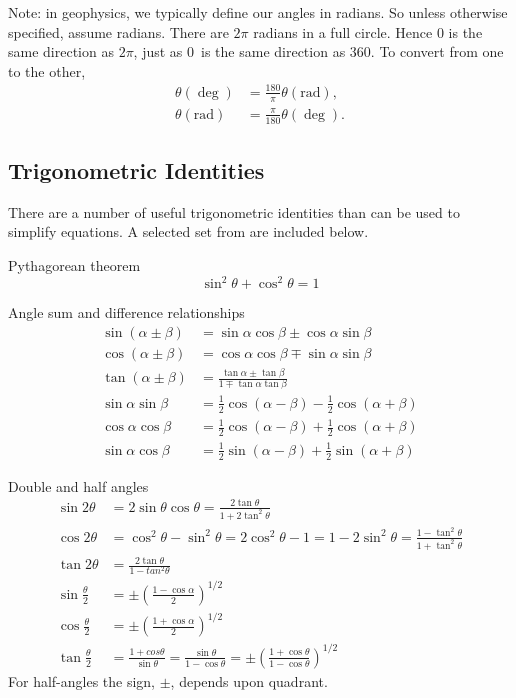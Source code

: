 Note: in geophysics, we typically define our angles in radians.  So unless
otherwise specified, assume radians.  There are $2\pi$ radians in a full circle.
Hence 0 is the same direction as $2\pi$, just as 0\deg\ is the same direction as
360\deg.  To convert from one to the other,
\begin{align*}
    \theta(\deg) &= \frac{180}{\pi} \theta(\mathrm{rad}), \\
    \theta(\mathrm{rad}) &= \frac{\pi}{180} \theta(\deg).
\end{align*}

\subsection{Trigonometric Identities}

There are a number of useful trigonometric identities than can be used
to simplify equations.  A selected set from \citet{Zwillinger1996} are included
below.

Pythagorean theorem
\begin{equation*}
    \sin^2 \theta + \cos^2 \theta = 1
\end{equation*}

Angle sum and difference relationships
\begin{align*}
    \sin(\alpha \pm \beta) &= \sin \alpha \cos \beta \pm \cos \alpha \sin \beta \\
    \cos(\alpha \pm \beta) &= \cos \alpha \cos \beta \mp \sin \alpha \sin \beta \\
    \tan(\alpha \pm \beta) &= \frac{\tan \alpha \pm \tan \beta}
        {1 \mp \tan \alpha \tan \beta} \\
    \sin \alpha \sin \beta &= \frac{1}{2} \cos (\alpha - \beta) 
        - \frac{1}{2} \cos (\alpha + \beta) \\
    \cos \alpha \cos \beta &= \frac{1}{2} \cos (\alpha - \beta) 
        + \frac{1}{2} \cos (\alpha + \beta) \\
    \sin \alpha \cos \beta &= \frac{1}{2} \sin (\alpha - \beta) 
        + \frac{1}{2} \sin (\alpha + \beta)
\end{align*}

Double and half angles
\begin{align*}
    \sin 2\theta &= 2\sin \theta \cos \theta 
        = \frac{2\tan \theta}{1 + 2 \tan^2 \theta} \\
    \cos 2\theta &= \cos^2 \theta - \sin^2 \theta 
        = 2\cos^2 \theta - 1 
        = 1 - 2 \sin^2 \theta
        = \frac{1 - \tan^2 \theta}{1 + \tan^2 \theta} \\
    \tan 2\theta &= \frac{2 \tan \theta}{1 - tan^2 \theta} \\
    \sin \frac{\theta}{2} &= \pm \left(\frac{1 - \cos \alpha}{2} \right)^{1/2} \\
    \cos \frac{\theta}{2} &= \pm \left(\frac{1 + \cos \alpha}{2} \right)^{1/2} \\
    \tan \frac{\theta}{2} &= \frac{1 + cos \theta}{\sin \theta}
        = \frac{\sin \theta}{1 - \cos \theta}
        = \pm \left( \frac{1 + \cos \theta}{1 - \cos \theta} \right)^{1/2}
\end{align*}
For half-angles the sign, $\pm$, depends upon quadrant.

